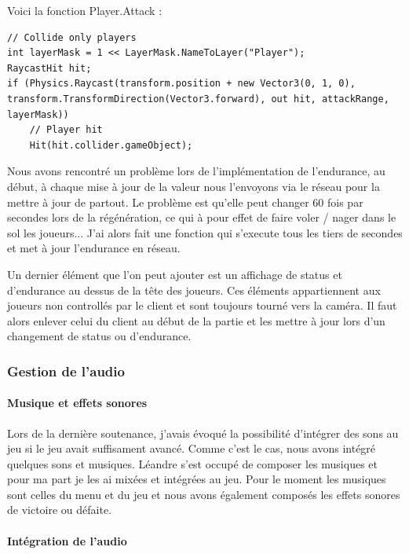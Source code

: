 \documentclass{article}
\begin{document}
Voici la fonction Player.Attack :

\begin{lstlisting}
// Collide only players
int layerMask = 1 << LayerMask.NameToLayer("Player");
RaycastHit hit;
if (Physics.Raycast(transform.position + new Vector3(0, 1, 0), transform.TransformDirection(Vector3.forward), out hit, attackRange, layerMask))
	// Player hit
	Hit(hit.collider.gameObject);
\end{lstlisting}

Nous avons rencontré un problème lors de l'implémentation de l'endurance, au début, à chaque mise à jour de la valeur nous l'envoyons via le réseau pour la mettre à jour de partout. Le problème est qu'elle peut changer 60 fois par secondes lors de la régénération, ce qui à pour effet de faire voler / nager dans le sol les joueurs... J'ai alors fait une fonction qui s'execute tous les tiers de secondes et met à jour l'endurance en réseau.

Un dernier élément que l'on peut ajouter est un affichage de status et d'endurance au dessus de la tête des joueurs. Ces éléments appartiennent aux joueurs non controllés par le client et sont toujours tourné vers la caméra. Il faut alors enlever celui du client au début de la partie et les mettre à jour lors d'un changement de status ou d'endurance.

\newpage
\subsubsection{Gestion de l'audio}

\paragraph{Musique et effets sonores}

Lors de la dernière soutenance, j'avais évoqué la possibilité d'intégrer des sons au jeu si le jeu avait suffisament avancé. Comme c'est le cas, nous avons intégré quelques sons et musiques. Léandre s'est occupé de composer les musiques et pour ma part je les ai mixées et intégrées au jeu. Pour le moment les musiques sont celles du menu et du jeu et nous avons également composés les effets sonores de victoire ou défaite.

\paragraph{Intégration de l'audio}
\end{document}
